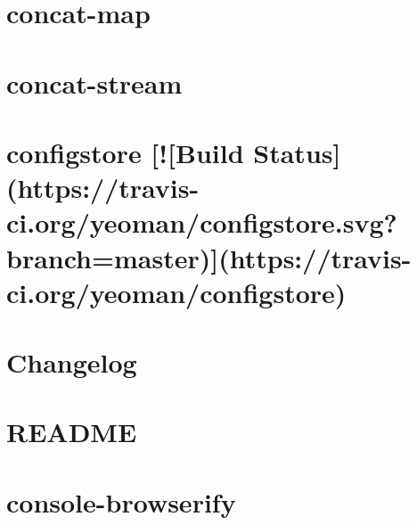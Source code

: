 \documentclass[twoside]{book}
\newcommand{\+}{\discretionary{\mbox{\scriptsize$\hookleftarrow$}}{}{}}
\begin{document}
\chapter{concat-\/map}
\label{md__c_1_workspace_demo_src_main_script_node_modules_concat-map__r_e_a_d_m_e}

\chapter{concat-\/stream}
\label{md__c_1_workspace_demo_src_main_script_node_modules_concat-stream_readme}

\chapter{configstore \mbox{[}!\mbox{[}Build Status\mbox{]}(https\+://travis-\/ci.org/yeoman/configstore.svg?branch=master)\mbox{]}(https\+://travis-\/ci.org/yeoman/configstore)}
\label{md__c_1_workspace_demo_src_main_script_node_modules_configstore_readme}

\chapter{Changelog}
\label{md__c_1_workspace_demo_src_main_script_node_modules_connect-history-api-fallback__c_h_a_n_g_e_l_o_g}

\chapter{R\+E\+A\+D\+ME}
\label{md__c_1_workspace_demo_src_main_script_node_modules_connect-history-api-fallback__r_e_a_d_m_e}

\chapter{console-\/browserify}
\label{md__c_1_workspace_demo_src_main_script_node_modules_console-browserify__r_e_a_d_m_e}

\end{document}
